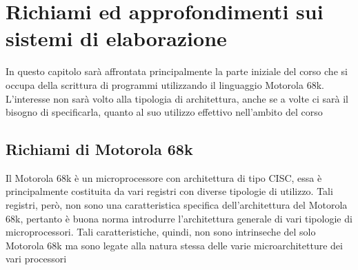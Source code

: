 \chapter{Richiami ed approfondimenti sui sistemi di
elaborazione}
In questo capitolo sarà affrontata principalmente la parte iniziale del corso che si occupa della scrittura di programmi utilizzando il linguaggio Motorola 68k. L'interesse non sarà volto alla tipologia di architettura, anche se a volte ci sarà il bisogno di specificarla, quanto al suo utilizzo effettivo nell'ambito del corso

\section{Richiami di Motorola 68k}
Il Motorola 68k è un microprocessore con architettura di tipo CISC, essa è principalmente costituita da vari registri con diverse tipologie di utilizzo. Tali registri, però, non sono una caratteristica specifica dell'architettura del Motorola 68k, pertanto è buona norma introdurre l'architettura generale di vari tipologie di microprocessori. Tali caratteristiche, quindi, non sono intrinseche del solo Motorola 68k ma sono legate alla natura stessa delle varie microarchitetture dei vari processori


